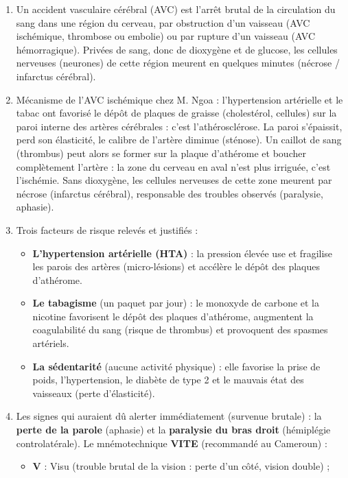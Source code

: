 \documentclass[11pt]{article}
\newcommand{\cle}[1]{{\popxbold\color{popdark}#1}}
\begin{document}
\begin{corrige}
\begin{enumerate}
\item Un \cle{accident vasculaire cérébral (AVC)} est l'arrêt brutal de la circulation du sang dans une région du cerveau, par obstruction d'un vaisseau (AVC ischémique, thrombose ou embolie) ou par rupture d'un vaisseau (AVC hémorragique). Privées de sang, donc de dioxygène et de glucose, les cellules nerveuses (neurones) de cette région meurent en quelques minutes (\cle{nécrose} / infarctus cérébral).
\item Mécanisme de l'AVC ischémique chez M. Ngoa : l'hypertension artérielle et le tabac ont favorisé le dépôt de plaques de graisse (cholestérol, cellules) sur la paroi interne des artères cérébrales : c'est l'\cle{athérosclérose}. La paroi s'épaissit, perd son élasticité, le calibre de l'artère diminue (sténose). Un caillot de sang (\cle{thrombus}) peut alors se former sur la plaque d'athérome et boucher complètement l'artère : la zone du cerveau en aval n'est plus irriguée, c'est l'\cle{ischémie}. Sans dioxygène, les cellules nerveuses de cette zone meurent par nécrose (infarctus cérébral), responsable des troubles observés (paralysie, aphasie).
\item Trois facteurs de risque relevés et justifiés :
\begin{itemize}
\item \textbf{L'hypertension artérielle (HTA)} : la pression élevée use et fragilise les parois des artères (micro-lésions) et accélère le dépôt des plaques d'athérome.
\item \textbf{Le tabagisme} (un paquet par jour) : le monoxyde de carbone et la nicotine favorisent le dépôt des plaques d'athérome, augmentent la coagulabilité du sang (risque de thrombus) et provoquent des spasmes artériels.
\item \textbf{La sédentarité} (aucune activité physique) : elle favorise la prise de poids, l'hypertension, le diabète de type 2 et le mauvais état des vaisseaux (perte d'élasticité).
\end{itemize}
\item Les signes qui auraient dû alerter immédiatement (survenue brutale) : la \textbf{perte de la parole} (aphasie) et la \textbf{paralysie du bras droit} (hémiplégie controlatérale). Le mnémotechnique \textbf{VITE} (recommandé au Cameroun) :
\begin{itemize}
\item \textbf{V} : Visu (trouble brutal de la vision : perte d'un côté, vision double) ;

\end{itemize}
\end{enumerate}
\end{corrige}
\end{document}
